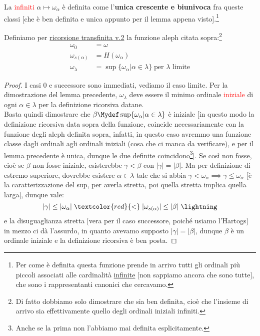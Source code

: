 \documentclass[11pt]{scrartcl}
\begin{document}
\begin{definition}
	La  \textcolor{red}{infiniti} $\alpha \mapsto \omega_\alpha$ è definita come l'\textbf{unica crescente e biunivoca} fra queste classi [che è ben definita e unica appunto per il lemma appena visto].\footnote{Per come è definita questa funzione prende in arrivo tutti gli ordinali più piccoli associati alle cardinalità \underline{infinite} [non sappiamo ancora che sono tutte], che sono i rappresentanti canonici che cercavamo.}
\end{definition}

\begin{proposition}
	Definiamo per \hyperref[ric_transf2]{ricorsione transfinita v.2} la funzione aleph citata sopra:\footnote{Di fatto dobbiamo solo dimostrare che sia ben definita, cioè che l'insieme di arrivo sia effettivamente quello degli ordinali iniziali infiniti.}
	\begin{align*}
		\omega_0 &= \omega \\
		\omega_{s(\alpha)} &= H(\omega_\alpha) \\
		\omega_\lambda &= \sup\{\omega_\alpha | \alpha \in \lambda\} \; \text{per $\lambda$ limite}
	\end{align*}
\end{proposition}

\begin{proof}
	I casi 0 e successore sono immediati, vediamo il caso limite. Per la dimostrazione del lemma precedente, $\omega_\lambda$ deve essere il 
	minimo ordinale \textcolor{red}{iniziale} di ogni $\alpha \in \lambda$ per la definizione ricorsiva datane.\\
	Basta quindi dimostrare che $\beta \Mydef \sup\{\omega_\alpha | \alpha \in \lambda\}$ è iniziale [in questo modo la definizione ricorsiva data sopra della funzione, coincide necessariamente con la funzione degli aleph definita sopra, infatti, in questo caso avremmo una funzione classe dagli ordinali agli ordinali iniziali (cosa che ci manca da verificare), e per il lemma precedente è unica, dunque le due definite coincidono\footnote{Anche se la prima non l'abbiamo mai definita esplicitamente.}].
	Se così non fosse, cioè se $\beta$ non fosse iniziale, esisterebbe $\gamma < \beta$ con $|\gamma| = |\beta|$. Ma per definizione di estremo superiore, dovrebbe esistere $\alpha \in \lambda$ tale che si abbia $\gamma < \omega_\alpha \implies \gamma \leq \omega_\alpha$ [è la caratterizzazione del sup, per averla stretta, poi quella stretta implica quella larga], dunque vale:
	\[ |\gamma| \leq |\omega_\alpha| \;\textcolor{red}{<}\; |\omega_{s(\alpha)}| \leq |\beta| \;\lightning
		\]
	e la disuguaglianza stretta [vera per il caso successore, poiché usiamo l'Hartogs] in mezzo ci dà l'assurdo, in quanto avevamo supposto $|\gamma| = |\beta|$, dunque $\beta$ è un ordinale iniziale e la definizione ricorsiva è ben posta.
\end{proof}
\end{document}
